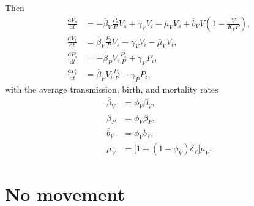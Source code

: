 \documentclass{article}
\newcommand{\md}{\mathrm{d}}
\begin{document}
Then
\begin{equation}
  \begin{split}
    \frac{\md V_s}{\md t}
    &=
    - \overline{\beta}_V \frac{P_i}{P} V_s
    + \gamma_V V_i
    - \overline{\mu}_V V_s
    + \overline{b}_V V \left(1 - \frac{V}{K_V P}\right),
    \\
    \frac{\md V_i}{\md t}
    &=
    \overline{\beta}_V \frac{P_i}{P} V_s
    - \gamma_V V_i
    - \overline{\mu}_V V_i,
    \\
    \frac{\md P_s}{\md t}
    &=
    - \overline{\beta}_P V_i \frac{P_s}{P}
    + \gamma_P P_i,
    \\
    \frac{\md P_i}{\md t}
    &=
    \overline{\beta}_P V_i \frac{P_s}{P}
    - \gamma_P P_i,
  \end{split}
\end{equation}
with the average transmission, birth, and mortality rates
\begin{equation}
  \begin{split}
    \overline{\beta}_V &= \phi_V \beta_V,
    \\
    \overline{\beta}_P &= \phi_V \beta_P,
    \\
    \overline{b}_V &= \phi_V b_V,
    \\
    \overline{\mu}_V &= \big[1 + (1 - \phi_V) \delta_V\big] \mu_V.
  \end{split}
\end{equation}


\section{No movement}
\end{document}
